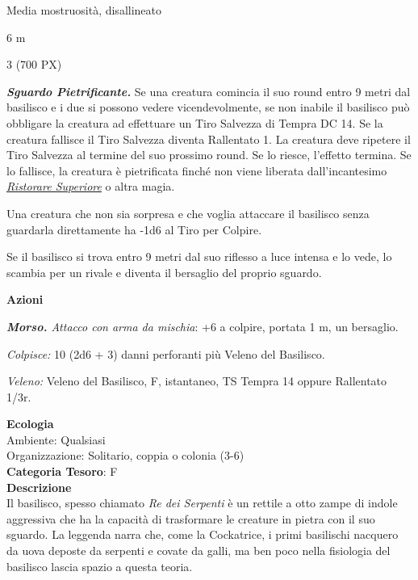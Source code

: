 \begin{multicols}{2}
{
\begin{description}[noitemsep, topsep=0pt, parsep=0pt, partopsep=0pt, itemsep=1pt, leftmargin=2.35cm,  labelwidth=2.2cm, itemindent=0cm, listparindent=0pt] %
\setlength{\baselineskip}{10pt}
\item[\textbf{Taglia/Tipo}] Media mostruosità, disallineato
\item[\textbf{Caratt.}] 
\item[\textbf{Punti Ferita}] 
\item[\textbf{Movimento}] 6 m
\item[\textbf{Tiri Salvez.}] 
\item[\textbf{Sensi}] 
\item[\textbf{Sfida}] 3 (700 PX)
\end{description}
\smallskip

\emph{\textbf{Sguardo Pietrificante.}} Se una creatura comincia il suo round entro 9 metri dal basilisco e i due si possono vedere vicendevolmente, se non inabile il basilisco può obbligare la creatura ad effettuare un Tiro Salvezza di Tempra DC 14. Se la creatura fallisce il Tiro Salvezza diventa Rallentato 1. La creatura deve ripetere il Tiro Salvezza al termine del suo prossimo round. Se lo riesce, l'effetto termina. Se lo fallisce, la creatura è pietrificata finché non viene liberata dall'incantesimo \emph{\hyperlink{Ristorare Superiore}{Ristorare Superiore}} o altra magia.

Una creatura che non sia sorpresa e che voglia attaccare il basilisco senza guardarla direttamente ha -1d6 al Tiro per Colpire.

Se il basilisco si trova entro 9 metri dal suo riflesso a luce intensa e lo vede, lo scambia per un rivale e diventa il bersaglio del proprio sguardo.

\textbf{Azioni}

\emph{\textbf{Morso.} Attacco con arma da mischia}: +6 a colpire, portata 1 m, un bersaglio.

\emph{Colpisce:} 10 (2d6 + 3) danni perforanti più Veleno del Basilisco.

\emph{Veleno:} Veleno del Basilisco, F, istantaneo, TS Tempra 14 oppure Rallentato 1/3r.

\textbf{Ecologia}\\
Ambiente: Qualsiasi\\
Organizzazione: Solitario, coppia o colonia (3-6)\\
\textbf{Categoria Tesoro}: F\\
\textbf{Descrizione}\\
Il basilisco, spesso chiamato \emph{Re dei Serpenti} è un rettile a otto zampe di indole aggressiva che ha la capacità di trasformare le creature in pietra con il suo sguardo. La leggenda narra che, come la Cockatrice, i primi basilischi nacquero da uova deposte da serpenti e covate da galli, ma ben poco nella fisiologia del basilisco lascia spazio a questa teoria.

}
\end{multicols}

